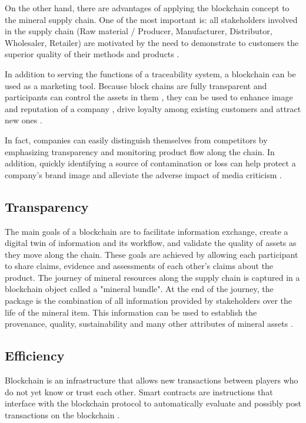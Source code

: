 On the other hand, there are advantages of applying the blockchain concept to the mineral supply chain. One of the most important is: all stakeholders involved in the supply chain (Raw material / Producer, Manufacturer, Distributor, Wholesaler, Retailer) are motivated by the need to demonstrate to customers the superior quality of their methods and products \cite{lu2017adaptable}. 

In addition to serving the functions of a traceability system, a blockchain can be used as a marketing tool. Because block chains are fully transparent\cite{iansiti2017truth} and participants can control the assets in them \cite{liao2011food}, they can be used to enhance image and reputation of a company \cite{van2007essentials}, drive loyalty among existing customers \cite{pizzuti2015global} and attract new ones \cite{svensson2009transparency}. 

In fact, companies can easily distinguish themselves from competitors by emphasizing transparency and monitoring product flow along the chain. In addition, quickly identifying a source of contamination or loss can help protect a company's brand image \cite{mejia2010traceability} and alleviate the adverse impact of media criticism \cite{dabbene2011food}.

\subsection{Transparency}\label{sec:transparency}

The main goals of a blockchain are to facilitate information exchange, create a digital twin of information and its workflow, and validate the quality of assets as they move along the chain. These goals are achieved by allowing each participant to share claims, evidence and assessments of each other's claims about the product. The journey of mineral resources along the supply chain is captured in a blockchain object called a "mineral bundle". At the end of the journey, the package is the combination of all information provided by stakeholders over the life of the mineral item. This information can be used to establish the provenance, quality, sustainability and many other attributes of mineral assets \cite{martin2017technology}.

\subsection{Efficiency}\label{sec:efficiency}
Blockchain is an infrastructure that allows new transactions between players who do not yet know or trust each other. Smart contracts are instructions that interface with the blockchain protocol to automatically evaluate and possibly post transactions on the blockchain \cite{raskin2017law}. 

